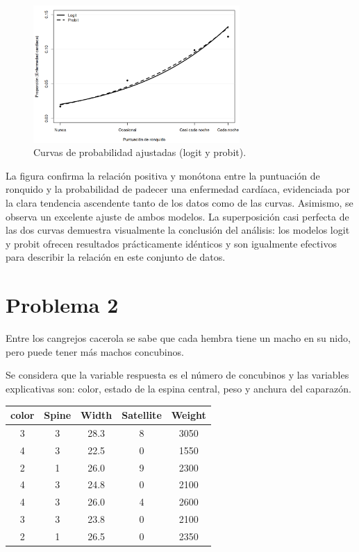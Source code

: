 \begin{figure}[H]
    \centering
    \includegraphics[width=0.7\textwidth]{images/snoring_glm_curves.png}
    \caption{Curvas de probabilidad ajustadas (logit y probit).}
    \label{fig:3}
\end{figure}

La figura confirma la relación positiva y monótona entre la puntuación de ronquido y la probabilidad de padecer una enfermedad cardíaca, evidenciada por la clara tendencia ascendente tanto de los datos como de las curvas. Asimismo, se observa un excelente ajuste de ambos modelos. La superposición casi perfecta de las dos curvas demuestra visualmente la conclusión del análisis: los modelos logit y probit ofrecen resultados prácticamente idénticos y son igualmente efectivos para describir la relación en este conjunto de datos.

\newpage

\section*{Problema \textcolor{CIMATRed}{2}}

Entre los cangrejos cacerola se sabe que cada hembra tiene un macho en su nido, pero puede tener más machos concubinos.

Se considera que la variable respuesta es el número de concubinos y las variables explicativas son: color, estado de la espina central, peso y anchura del caparazón.

\begin{center}
\begin{tabular}{ccccc}
\toprule
\textbf{color} & \textbf{Spine} & \textbf{Width} & \textbf{Satellite} & \textbf{Weight} \\
\midrule
3 & 3 & 28.3 & 8 & 3050 \\
4 & 3 & 22.5 & 0 & 1550 \\
2 & 1 & 26.0 & 9 & 2300 \\
4 & 3 & 24.8 & 0 & 2100 \\
4 & 3 & 26.0 & 4 & 2600 \\
3 & 3 & 23.8 & 0 & 2100 \\
2 & 1 & 26.5 & 0 & 2350 \\
\bottomrule
\end{tabular}
\end{center}

